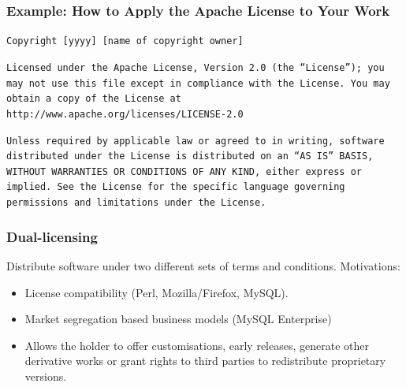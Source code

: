 
\begin{frame}
\frametitle{Example: How to Apply the Apache License to Your Work}

\footnotesize

\texttt{Copyright [yyyy] [name of copyright owner]}

\medskip

\texttt{Licensed under the Apache License, Version 2.0 (the ``License'');
   you may not use this file except in compliance with the License.
   You may obtain a copy of the License at http://www.apache.org/licenses/LICENSE-2.0}

\medskip

\texttt{Unless required by applicable law or agreed to in writing, software
   distributed under the License is distributed on an ``AS IS'' BASIS,
   WITHOUT WARRANTIES OR CONDITIONS OF ANY KIND, either express or implied.
   See the License for the specific language governing permissions and
   limitations under the License.}


\end{frame}



\begin{frame}
\frametitle{Dual-licensing}

Distribute software under two different sets of terms and conditions. Motivations:

\begin{itemize}
\item License compatibility (Perl, Mozilla/Firefox, MySQL).
\item Market segregation based business models (MySQL Enterprise)
\item Allows the holder to offer customisations, early releases, generate other derivative works or grant rights to third parties to redistribute proprietary versions.
\end{itemize}

                                                 
\end{frame}




